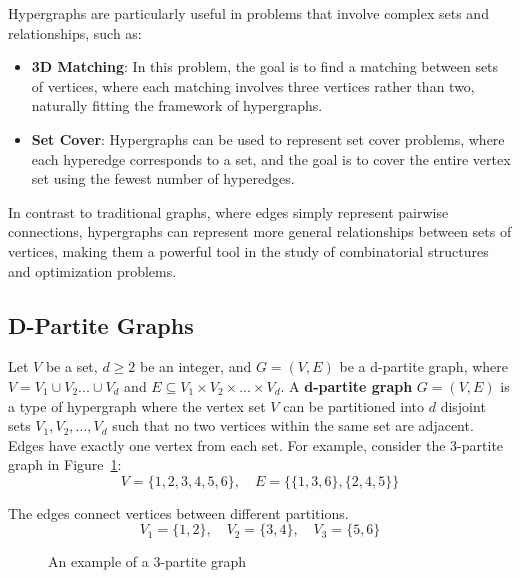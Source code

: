 Hypergraphs are particularly useful in problems that involve complex sets and relationships, such as:
\begin{itemize}
    \item \textbf{3D Matching}: In this problem, the goal is to find a matching between sets of vertices, where each matching involves three vertices rather than two, naturally fitting the framework of hypergraphs.
    \item \textbf{Set Cover}: Hypergraphs can be used to represent set cover problems, where each hyperedge corresponds to a set, and the goal is to cover the entire vertex set using the fewest number of hyperedges.
\end{itemize}

In contrast to traditional graphs, where edges simply represent pairwise connections, hypergraphs can represent more general relationships between sets of vertices, making them a powerful tool in the study of combinatorial structures and optimization problems.

\subsection{D-Partite Graphs} 
Let \( V \) be a set, \( d \geq 2 \) be an integer, and \( G = (V, E) \) be a d-partite graph, where \(V = V_1 \cup V_2 ... \cup V_d\) and \(E \subseteq V_1 \times V_2 \times ... \times V_d\). A \textbf{d-partite graph} \( G = (V, E) \) is a type of hypergraph where the vertex set \( V \) can be partitioned into \( d \) disjoint sets \( V_1, V_2, \dots, V_d \) such that no two vertices within the same set are adjacent. Edges have exactly one vertex from each set. For example, consider the 3-partite graph in Figure~\ref{fig:d-partite}:
\[
V = \{1, 2, 3, 4, 5, 6\}, \quad E = \{\{1, 3, 6\}, \{2, 4, 5\}\}
\]

The edges connect vertices between different partitions.
\[
V_1 = \{1, 2\}, \quad V_2 = \{3, 4\}, \quad V_3 = \{5, 6\}
\]

\begin{figure}[h]
\begin{center}
\caption{An example of a 3-partite graph}
\label{fig:d-partite}
\end{center}
\end{figure}

